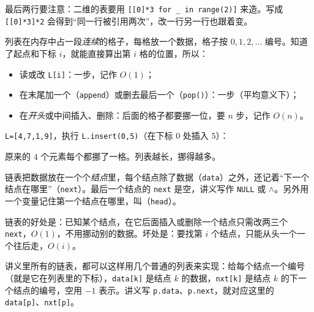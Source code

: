 最后两行要注意：二维的表要用 \texttt{[[0]*3 for \_ in range(2)]} 来造。写成 \texttt{[[0]*3]*2} 会得到“同一行被引用两次”，改一行另一行也跟着变。


列表在内存中占一段\emph{连续}的格子，每格放一个数据，格子按 $0,1,2,\dots$ 编号。知道了起点和下标 $i$，就能直接算出第 $i$ 格的位置，所以：
\begin{itemize}
\item 读或改 \texttt{L[i]}：一步，记作 $O(1)$；
\item 在末尾加一个（\texttt{append}）或删去最后一个（\texttt{pop()}）：一步（平均意义下）；
\item 在\emph{开头}或中间插入、删除：后面的格子都要挪一位，要 $n$ 步，记作 $O(n)$。
\end{itemize}

\begin{example}
\texttt{L=[4,7,1,9]}，执行 \texttt{L.insert(0,5)}（在下标 $0$ 处插入 $5$）：
\begin{center}
\end{center}
原来的 $4$ 个元素每个都挪了一格。列表越长，挪得越多。
\end{example}


链表把数据放在一个个\emph{结点}里，每个结点除了数据（\texttt{data}）之外，还记着“下一个结点在哪里”（\texttt{next}）。最后一个结点的 \texttt{next} 是空，讲义写作 \texttt{NULL} 或 $\wedge$。另外用一个变量记住第一个结点在哪里，叫（\texttt{head}）。

链表的好处是：已知某个结点，在它后面插入或删除一个结点只需改两三个 \texttt{next}，$O(1)$，不用挪动别的数据。坏处是：要找第 $i$ 个结点，只能从头一个一个往后走，$O(i)$。

讲义里所有的链表，都可以这样用几个普通的列表来实现：给每个结点一个编号（就是它在列表里的下标），\texttt{data[k]} 是结点 $k$ 的数据，\texttt{nxt[k]} 是结点 $k$ 的下一个结点的编号，空用 $-1$ 表示。讲义写 \texttt{p.data}、\texttt{p.next}，就对应这里的 \texttt{data[p]}、\texttt{nxt[p]}。


